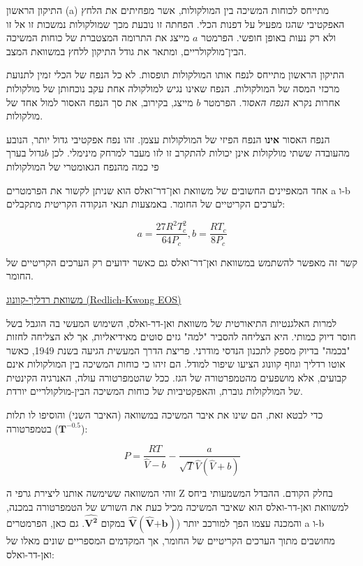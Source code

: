 \documentclass[
  hebrew,
  letterpaper,
  DIV=11,
  numbers=noendperiod]{scrreprt}
\begin{document}
התיקון הראשון (a) מתייחס לכוחות המשיכה בין המולקולות, אשר מפחיתים את
הלחץ האפקטיבי שהגז מפעיל על דפנות הכלי. הפחתה זו נובעת מכך שמולקולות
נמשכות זו אל זו ולא רק נעות באופן חופשי. הפרמטר \(a\) מייצג את התרומה
המצטברת של כוחות המשיכה הבין־מולקולריים, ומתאר את גודל התיקון ללחץ
במשוואת המצב.

התיקון הראשון מתייחס לנפח אותו המולקולות תופסות. לא כל הנפח של הכלי זמין
לתנועת מרכזי המסה של המולקולות. הנפח שאינו נגיש למולקולה אחת עקב נוכחותן
של מולקולות אחרות נקרא \emph{הנפח האסור}. הפרמטר \(b\) מייצג, בקירוב, את
סך הנפח האסור למול אחד של מולקולות.

הנפח האסור \textbf{אינו} הנפח הפיזי של המולקולות עצמן. זהו נפח אפקטיבי
גדול יותר, הנובע מהעובדה ששתי מולקולות אינן יכולות להתקרב זו לזו מעבר
למרחק מינימלי. לכן \(b\)גדול בערך פי כמה מהנפח הגאומטרי של המולקולות

אחד המאפיינים החשובים של משוואת ואן־דר־ואלס הוא שניתן לקשור את הפרמטרים
a ו-b לערכים הקריטיים של החומר. באמצעות תנאי הנקודה הקריטית מתקבלים:

\[a = \frac{27R^{2}T_{c}^{2}}{64P_{c}},b = \frac{RT_{c}}{8P_{c}}\]

קשר זה מאפשר להשתמש במשוואת ואן־דר־ואלס גם כאשר ידועים רק הערכים
הקריטיים של החומר.

\ul{משוואת רדליך-קוונוג (Redlich-Kwong EOS)}

למרות האלגנטיות התיאורטית של משוואת ואן-דר-ואלס, השימוש המעשי בה הוגבל
בשל חוסר דיוק כמותי. היא הצליחה להסביר "למה" גזים סוטים מאידיאליות, אך
לא הצליחה לחזות "בכמה" בדיוק מספק לתכנון הנדסי מודרני. פריצת הדרך המעשית
הגיעה בשנת 1949, כאשר אוטו רדליך וג\textquotesingle וזף קוונוג הציעו
שיפור למודל. הם זיהו כי כוחות המשיכה בין המולקולות אינם קבועים, אלא
מושפעים מהטמפרטורה של הגז. ככל שהטמפרטורה עולה, האנרגיה הקינטית של
המולקולות גוברת, והאפקטיביות של כוחות המשיכה הבין-מולקולריים יורדת.

כדי לבטא זאת, הם שינו את איבר המשיכה במשוואה (האיבר השני) והוסיפו לו
תלות בטמפרטורה (\(\mathbf{T}^{\mathbf{- 0.5}}\)):

\[P = \frac{RT}{\widehat{V} - b} - \frac{a}{\sqrt{T}\widehat{V}\left( \widehat{V} + b \right)}\]

זוהי המשוואה ששימשה אותנו ליצירת גרפי ה Z בחלק הקודם. ההבדל המשמעותי
ביחס למשוואת ואן-דר-ואלס הוא שאיבר המשיכה מכיל כעת את השורש של הטמפרטורה
במכנה, והמכנה עצמו הפך למורכב יותר
(\(\widehat{\mathbf{V}}\left( \widehat{\mathbf{V}}\mathbf{+ b} \right)\)
במקום \(\widehat{\mathbf{V}^{\mathbf{2}}}\). גם כאן, הפרמטרים a ו-b
מחושבים מתוך הערכים הקריטיים של החומר, אך המקדמים המספריים שונים מאלו של
ואן-דר-ואלס:
\end{document}
